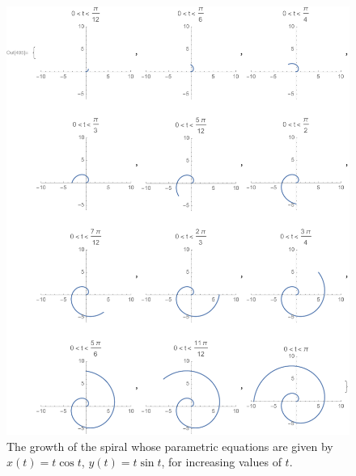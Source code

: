 \documentclass[12pt]{article}
\begin{document}
	\begin{figure}[h]
		\begin{center}
			\includegraphics[trim={20mm 0 3mm 0}, clip, scale=0.825]{4_Spirals3}
			\caption{The growth of the spiral whose parametric equations are given by $x(t)=t\cos{t}$, $y(t)=t\sin{t}$, for increasing values of $t$.}
			\label{fig:spirals}
		\end{center}
	\end{figure}
\end{document}
